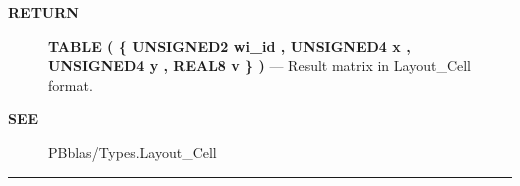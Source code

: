 \par
\begin{description}
\item [\colorbox{tagtype}{\color{white} \textbf{\textsf{RETURN}}}] \textbf{TABLE ( \{ UNSIGNED2 wi\_id , UNSIGNED4 x , UNSIGNED4 y , REAL8 v \} )} --- Result matrix in Layout\_Cell format.
\end{description}







\par
\begin{description}
\item [\colorbox{tagtype}{\color{white} \textbf{\textsf{SEE}}}] PBblas/Types.Layout\_Cell
\end{description}



\rule{\linewidth}{0.5pt}
